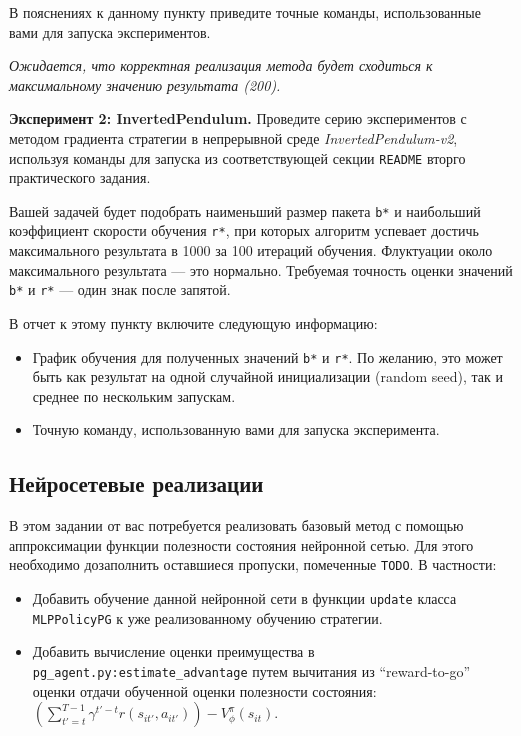 \documentclass[12pt, oneside]{article}
\begin{document}
В пояснениях к данному пункту приведите точные команды, использованные вами для запуска экспериментов.

\textit{Ожидается, что корректная реализация метода будет сходиться к максимальному значению результата (200).}

\textbf{Эксперимент 2: InvertedPendulum.} Проведите серию экспериментов с методом градиента стратегии в непрерывной среде \textit{InvertedPendulum-v2}, используя команды для запуска из соответствующей секции \verb|README| вторго практического задания.

Вашей задачей будет подобрать наименьший размер пакета \verb|b*| и наибольший коэффициент скорости обучения \verb|r*|, при которых алгоритм успевает достичь максимального результата в 1000 за 100 итераций обучения. Флуктуации около максимального результата --- это нормально. Требуемая точность оценки значений \verb|b*| и \verb|r*| --- один знак после запятой.

В отчет к этому пункту включите следующую информацию:

\begin{itemize}
    \item График обучения для полученных значений \verb|b*| и \verb|r*|. По желанию, это может быть как результат на одной случайной инициализации (random seed), так и среднее по нескольким запускам.
    \item Точную команду, использованную вами для запуска эксперимента.
\end{itemize}

\subsection{Нейросетевые реализации}

В этом задании от вас потребуется реализовать базовый метод с помощью аппроксимации функции полезности состояния нейронной сетью. Для этого необходимо дозаполнить оставшиеся пропуски, помеченные \verb|TODO|. В частности:

\begin{itemize}
    \item Добавить обучение данной нейронной сети в функции \verb|update| класса \verb|MLPPolicyPG| к уже реализованному обучению стратегии.
    \item Добавить вычисление оценки преимущества в \verb|pg_agent.py:estimate_advantage| путем вычитания из ``reward-to-go'' оценки отдачи обученной оценки полезности состояния: $\left( \sum_{t' = t}^{T - 1} {\gamma^{t'-t} r(s_{it'}, a_{it'})} \right) - V_\phi^\pi (s_{it})$.
\end{itemize}
\end{document}
